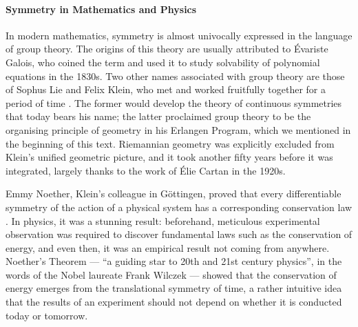 
\paragraph{Symmetry in Mathematics and Physics}
In modern mathematics, symmetry is almost univocally expressed in the language of group theory. %
The origins of this theory are usually attributed to {\'E}variste Galois, who coined the term and used it to study solvability of polynomial equations in the 1830s. 
%
Two other names associated with group theory are those of Sophus Lie and Felix Klein, who met and worked fruitfully together for a period of time \citep{tobies2019felix}. The former would develop the theory of continuous symmetries that today bears his name; the latter proclaimed group theory to be the organising principle of geometry in his Erlangen Program, which we mentioned in the beginning of this text. Riemannian geometry was explicitly excluded from Klein's unified geometric picture, and it took another fifty years before it was integrated, largely thanks to the work of {\'E}lie Cartan in the 1920s.   




Emmy Noether, Klein's colleague in G\"ottingen, proved that every differentiable symmetry of the action of a physical system has a corresponding conservation law \citep{variationsprobleme1918nachr}. In physics, it was a stunning result: beforehand, meticulous experimental observation was required to discover fundamental laws such as the conservation of energy, and even then, it was an empirical result not coming from anywhere. Noether’s Theorem --- ``a guiding star to 20th and 21st century physics'', in the words of the Nobel laureate Frank Wilczek --- showed that the conservation of energy emerges from the translational symmetry of time, a rather intuitive idea that the results of an experiment should not depend on whether it is conducted today or tomorrow. 



